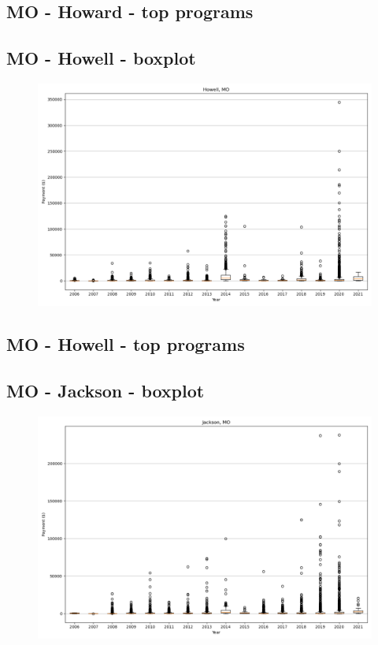 \subsection*{MO - Howard - top programs}

\newpage
\subsection*{MO - Howell - boxplot}
\begin{figure}[h]
\centering
\includegraphics[width=7in]{../output/boxplots/counties/Howell-MO_boxplot.png}
\end{figure}


\subsection*{MO - Howell - top programs}

\newpage
\subsection*{MO - Jackson - boxplot}
\begin{figure}[h]
\centering
\includegraphics[width=7in]{../output/boxplots/counties/Jackson-MO_boxplot.png}
\end{figure}


